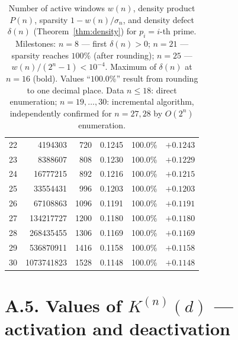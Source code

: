 \begin{table}[H]
\begin{tabular}{r|rrrrr}
22 &    4194303 &  720 & 0{.}1245 &100{.}0\% & $+0{.}1243$ \\
23 &    8388607 &  808 & 0{.}1230 &100{.}0\% & $+0{.}1229$ \\
24 &   16777215 &  892 & 0{.}1216 &100{.}0\% & $+0{.}1215$ \\
25 &   33554431 &  996 & 0{.}1203 &100{.}0\% & $+0{.}1203$ \\
26 &   67108863 & 1096 & 0{.}1191 &100{.}0\% & $+0{.}1191$ \\
27 &  134217727 & 1200 & 0{.}1180 &100{.}0\% & $+0{.}1180$ \\
28 &  268435455 & 1306 & 0{.}1169 &100{.}0\% & $+0{.}1169$ \\
29 &  536870911 & 1416 & 0{.}1158 &100{.}0\% & $+0{.}1158$ \\
30 & 1073741823 & 1528 & 0{.}1148 &100{.}0\% & $+0{.}1148$ \\
\bottomrule
\end{tabular}
\caption{Number of active windows $w(n)$, density product $P(n)$,
sparsity $1 - w(n)/\sigma_n$,
and density defect $\delta(n)$ (Theorem~\ref{thm:density})
for $p_i = i$-th prime.
Milestones: $n=8$ --- first $\delta(n) > 0$;
$n=21$ --- sparsity reaches $100\%$ (after rounding);
$n=25$ --- $w(n)/(2^n-1) < 10^{-4}$.
Maximum of $\delta(n)$ at $n=16$ (bold).
Values ``$100.0\%$'' result from rounding to one decimal place.
Data $n \leq 18$: direct enumeration;
$n = 19, \ldots, 30$: incremental algorithm,
independently confirmed for $n=27,28$ by $O(2^n)$ enumeration.}
\label{tab:mertens}
\end{table}

\newpage
\section*{A.5. Values of $K^{(n)}(d)$ --- activation and deactivation}
\label{subsec:a5-values}

